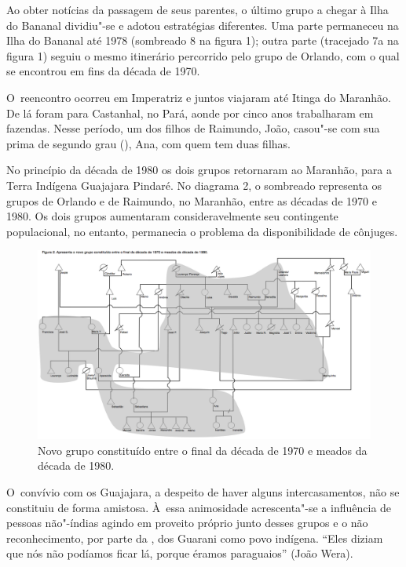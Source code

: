 Ao obter notícias da passagem de seus parentes, o último grupo a chegar
à Ilha do Bananal dividiu"-se e adotou estratégias diferentes. Uma parte
permaneceu na Ilha do Bananal até 1978 (sombreado 8 na figura 1); outra
parte (tracejado 7a na figura 1) seguiu o mesmo itinerário percorrido
pelo grupo de Orlando, com o qual se encontrou em fins da década de
1970.

O~reencontro ocorreu em Imperatriz e juntos viajaram até Itinga do
Maranhão. De lá foram para Castanhal, no Pará, aonde por cinco anos
trabalharam em fazendas. Nesse período, um dos filhos de Raimundo, João,
casou"-se com sua prima de segundo grau (), Ana, com quem tem duas
filhas.

No princípio da década de 1980 os dois grupos retornaram ao Maranhão,
para a Terra Indígena Guajajara Pindaré. No diagrama 2, o sombreado
representa os grupos de Orlando e de Raimundo, no Maranhão, entre as
décadas de 1970 e 1980. Os dois grupos aumentaram consideravelmente seu
contingente populacional, no entanto, permanecia o problema da
disponibilidade de cônjuges.

\begin{figure}
  \centering
 \includegraphics[width=\textwidth]{./img/GUARANIS-img10.png}	
  \hfill
  \caption{Novo grupo constituído entre o final da década de 1970 e meados da década de 1980.}
\end{figure}
 
 

O~convívio com os Guajajara, a despeito de haver alguns intercasamentos,
não se constituiu de forma amistosa. À~essa animosidade acrescenta"-se a
influência de pessoas não"-índias agindo em proveito próprio junto
desses grupos
e o não reconhecimento, por parte da
, dos Guarani como povo indígena. ``Eles diziam que nós não
podíamos ficar lá, porque éramos paraguaios'' (João Wera). 

